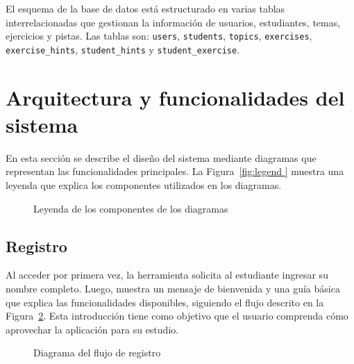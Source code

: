\documentclass{article}
\begin{document}
El esquema de la base de datos está estructurado en varias tablas interrelacionadas que gestionan la información de usuarios, estudiantes, temas, ejercicios y pistas. Las tablas son: \texttt{users}, \texttt{students}, \texttt{topics}, \texttt{exercises}, \texttt{exercise\_hints}, \texttt{student\_hints} y \texttt{student\_exercise}.

\section{Arquitectura y funcionalidades del sistema}

En esta sección se describe el diseño del sistema mediante diagramas que representan las funcionalidades principales. La Figura~\ref{fig:legend } muestra una leyenda que explica los componentes utilizados en los diagramas.

\begin{figure}[h!]
  \centering
      \caption{Leyenda de los componentes de los diagramas}\label{fig:legend}
\end{figure}

\subsection{Registro}

Al acceder por primera vez, la herramienta solicita al estudiante ingresar su nombre completo. Luego, muestra un mensaje de bienvenida y una guía básica que explica las funcionalidades disponibles, siguiendo el flujo descrito en la Figura~\ref{fig:register}. Esta introducción tiene como objetivo que el usuario comprenda cómo aprovechar la aplicación para su estudio.

\begin{figure}[h!]
  \centering
  \caption{Diagrama del flujo de registro}\label{fig:register}
\end{figure}
\end{document}
